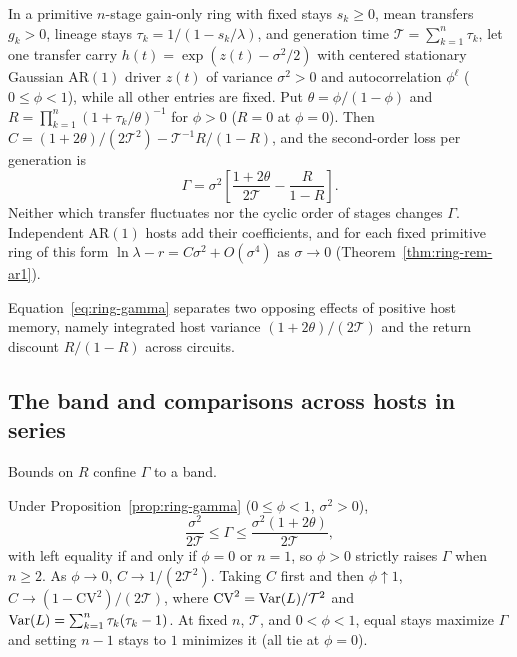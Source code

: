 \begin{proposition}\label{prop:ring-gamma}
In a primitive $n$-stage gain-only ring with fixed stays $s_k \ge 0$, mean transfers $g_k > 0$, lineage stays $\tau_k = 1/(1 - s_k/\lambda)$, and generation time $\mathcal{T} = \sum_{k=1}^n \tau_k$, let one transfer carry $h(t) = \exp(z(t) - \sigma^2/2)$ with centered stationary Gaussian $\mathrm{AR}(1)$ driver $z(t)$ of variance $\sigma^2 > 0$ and autocorrelation $\phi^\ell$ ($0 \le \phi < 1$), while all other entries are fixed. Put $\theta = \phi/(1 - \phi)$ and $R = \prod_{k=1}^n (1 + \tau_k/\theta)^{-1}$ for $\phi > 0$ ($R = 0$ at $\phi = 0$). Then $C = (1 + 2\theta)/(2\mathcal{T}^2) - \mathcal{T}^{-1} R/(1 - R)$, and the second-order loss per generation is
\begin{equation}
\Gamma = \sigma^2 \left[ \frac{1 + 2\theta}{2\mathcal{T}} - \frac{R}{1 - R} \right].
\label{eq:ring-gamma}
\end{equation}
Neither which transfer fluctuates nor the cyclic order of stages changes $\Gamma$. Independent $\mathrm{AR}(1)$ hosts add their coefficients, and for each fixed primitive ring of this form $\ln\lambda - r = C\sigma^2 + O(\sigma^4)$ as $\sigma \to 0$ (Theorem~\ref{thm:ring-rem-ar1}).
\end{proposition}

Equation~\eqref{eq:ring-gamma} separates two opposing effects of positive host memory, namely integrated host variance $(1 + 2\theta)/(2\mathcal{T})$ and the return discount $R/(1 - R)$ across circuits.

\subsection{The band and comparisons across hosts in series}\label{subsec:ring-series}

Bounds on $R$ confine $\Gamma$ to a band.

\begin{proposition}\label{prop:ring-band}
Under Proposition~\ref{prop:ring-gamma} ($0 \le \phi < 1$, $\sigma^2 > 0$),
\begin{equation}
\frac{\sigma^2}{2\mathcal{T}} \le \Gamma \le \frac{\sigma^2(1 + 2\theta)}{2\mathcal{T}},
\label{eq:ring-band}
\end{equation}
with left equality if and only if $\phi = 0$ or $n = 1$, so $\phi > 0$ strictly raises $\Gamma$ when $n \ge 2$. As $\phi \to 0$, $C \to 1/(2\mathcal{T}^2)$. Taking $C$ first and then $\phi \uparrow 1$, $C \to (1 - \mathrm{CV}^2)/(2\mathcal{T})$, where $\mathrm{CV}^2 = \operatorname{Var}(L)/\mathcal{T}^2$ and $\operatorname{Var}(L) = \sum_{k=1}^n \tau_k(\tau_k - 1)$. At fixed $n$, $\mathcal{T}$, and $0 < \phi < 1$, equal stays maximize $\Gamma$ and setting $n - 1$ stays to $1$ minimizes it (all tie at $\phi = 0$).
\end{proposition}

